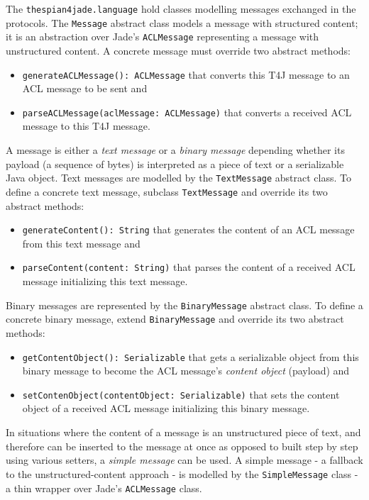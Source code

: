 The \texttt{thespian4jade.language} hold classes modelling messages exchanged in the protocols.
The \texttt{Message} abstract class models a message with structured content; it is an abstraction over Jade's \texttt{ACLMessage} representing a message with unstructured content.
A concrete message must override two abstract methods:
\begin{itemize}
	\item \texttt{generateACLMessage(): ACLMessage} that converts this T4J message to an ACL message to be sent and
	\item \texttt{parseACLMessage(aclMessage: ACLMessage)} that converts a received ACL message to this T4J message.
\end{itemize}
A message is either a \textit{text message} or a \textit{binary message} depending whether its payload (a sequence of bytes) is interpreted as a piece of text or a serializable Java object.
Text messages are modelled by the \texttt{TextMessage} abstract class.
To define a concrete text message, subclass \texttt{TextMessage} and override its two abstract methods:
\begin{itemize}
	\item \texttt{generateContent(): String} that generates the content of an ACL message from this text message and
	\item \texttt{parseContent(content: String)} that parses the content of a received ACL message initializing this text message. 
\end{itemize}
Binary messages are represented by the \texttt{BinaryMessage} abstract class.
To define a concrete binary message, extend \texttt{BinaryMessage} and override its two abstract methods:
\begin{itemize}
	\item \texttt{getContentObject(): Serializable} that gets a serializable object from this binary message to become the ACL message's \textit{content object} (payload) and
	\item \texttt{setContenObject(contentObject: Serializable)} that sets the content object of a received ACL message initializing this binary message.
\end{itemize}

In situations where the content of a message is an unstructured piece of text, and therefore can be inserted to the message at once as opposed to built step by step using various setters, a \textit{simple message} can be used.
A simple message - a fallback to the unstructured-content approach - is modelled by the \texttt{SimpleMessage} class - a thin wrapper over Jade's \texttt{ACLMessage} class.

